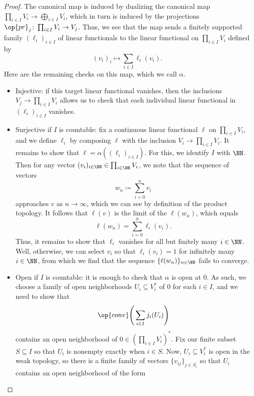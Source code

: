 \documentclass[notes.tex]{subfiles}
\begin{document}
\begin{proof}
	The canonical map is induced by dualizing the canonical map $\prod_{i\in I}V_i\to\bigoplus_{i\in I}V_i$, which in turn is induced by the projections $\op{pr}_j\colon\prod_{i\in I}V_i\to V_j$. Thus, we see that the map sends a finitely supported family $(\ell_i)_{i\in I}$ of linear functionals to the linear functional on $\prod_{i\in I}V_i$ defined by
	\[(v_i)_i\mapsto\sum_{i\in I}\ell_i(v_i).\]
	Here are the remaining checks on this map, which we call $\alpha$.
	\begin{itemize}
		\item Injective: if this target linear functional vanishes, then the inclusions $V_j\to\prod_{i\in I}V_i$ allows us to check that each individual linear functional in $(\ell_i)_{i\in I}$ vanishes.
		\item Surjective if $I$ is countable: fix a continuous linear functional $\ell$ on $\prod_{i\in I}V_i$, and we define $\ell_i$ by composing $\ell$ with the inclusion $V_i\to\prod_{i\in I}V_i$. It remains to show that $\ell=\alpha((\ell_i)_{i\in I})$. For this, we identify $I$ with $\NN$. Then for any vector $(v_i)_{i\in\NN}\in\prod_{i\in\NN}V_i$, we note that the sequence of vectors
		\[w_n\coloneqq\sum_{i=0}^nv_i\]
		approaches $v$ as $n\to\infty$, which we can see by definition of the product topology. It follows that $\ell(v)$ is the limit of the $\ell(w_n)$, which equals
		\[\ell(w_n)=\sum_{i=0}^n\ell_i(v_i).\]
		Thus, it remains to show that $\ell_i$ vanishes for all but finitely many $i\in\NN$. Well, otherwise, we can select $v_i$ so that $\ell_i(v_i)=1$ for infinitely many $i\in\NN$, from which we find that the sequence $\{\ell(w_n)\}_{n\in\NN}$ fails to converge.
		\item Open if $I$ is countable: it is enough to check that $\alpha$ is open at $0$. As such, we choose a family of open neighborhoods $U_i\subseteq V_i^*$ of $0$ for each $i\in I$, and we need to show that
		\[\op{conv}\Bigg(\sum_{i\in I}j_i(U_i)\Bigg)\]
		contains an open neighborhood of $0\in\left(\prod_{i\in I}V_i\right)^*$. Fix our finite subset $S\subseteq I$ so that $U_i$ is nonempty exactly when $i\in S$. Now, $U_i\subseteq V_i^*$ is open in the weak topology, so there is a finite family of vectors $\{v_{ij}\}_{j\in S_i}$ so that $U_i$ contains an open neighborhood of the form

\end{itemize}
\end{proof}
\end{document}
